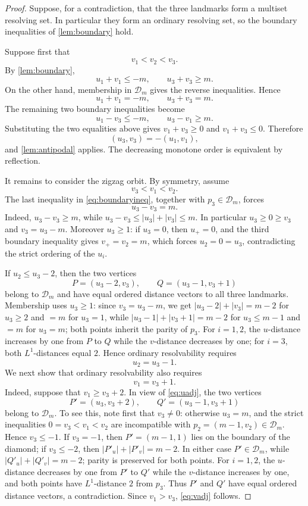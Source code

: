 \documentclass[10pt,a4paper]{amsart}
\newcommand{\D}{\mathcal D}
\begin{document}
\begin{proof}
Suppose, for a contradiction, that the three landmarks form a multiset resolving set.  In particular they form an ordinary resolving set, so the boundary inequalities of \cref{lem:boundary} hold.

Suppose first that
\[
 v_1<v_2<v_3.
\]
By \cref{lem:boundary},
\[
 u_1+v_1\le -m,
 \qquad
 u_3+v_3\ge m.
\]
On the other hand, membership in $\D_m$ gives the reverse inequalities.  Hence
\[
 u_1+v_1=-m,
 \qquad
 u_3+v_3=m.
\]
The remaining two boundary inequalities become
\[
 u_1-v_3\le -m,
 \qquad
 u_3-v_1\ge m.
\]
Substituting the two equalities above gives $v_1+v_3\ge0$ and $v_1+v_3\le0$.  Therefore
\[
 (u_3,v_3)=-(u_1,v_1),
\]
and \cref{lem:antipodal} applies.  The decreasing monotone order is equivalent by reflection.

It remains to consider the zigzag orbit.  By symmetry, assume
\begin{equation}\label{eq:zigzagorder}
 v_3<v_1<v_2.
\end{equation}
The last inequality in \eqref{eq:boundaryineq}, together with $p_3\in\D_m$, forces
\begin{equation}\label{eq:p3edge}
 u_3-v_3=m.
\end{equation}
Indeed, $u_3-v_3\ge m$, while $u_3-v_3\le |u_3|+|v_3|\le m$.  In particular $u_3\ge0\ge v_3$ and $v_3=u_3-m$.  Moreover $u_3\ge1$: if $u_3=0$, then $u_+=0$, and the third boundary inequality gives $v_+=v_2=m$, which forces $u_2=0=u_3$, contradicting the strict ordering of the $u_i$.

If $u_2\le u_3-2$, then the two vertices
\[
 P=(u_3-2,v_3),
 \qquad
 Q=(u_3-1,v_3+1)
\]
belong to $\D_m$ and have equal ordered distance vectors to all three landmarks.  Membership uses $u_3\ge1$: since $v_3=u_3-m$, we get $|u_3-2|+|v_3|=m-2$ for $u_3\ge2$ and $=m$ for $u_3=1$, while $|u_3-1|+|v_3+1|=m-2$ for $u_3\le m-1$ and $=m$ for $u_3=m$; both points inherit the parity of $p_3$.  For $i=1,2$, the $u$-distance increases by one from $P$ to $Q$ while the $v$-distance decreases by one; for $i=3$, both $L^1$-distances equal $2$.  Hence ordinary resolvability requires
\begin{equation}\label{eq:uadj}
 u_2=u_3-1.
\end{equation}
We next show that ordinary resolvability also requires
\begin{equation}\label{eq:vadj}
 v_1=v_3+1.
\end{equation}
Indeed, suppose that $v_1\ge v_3+2$.  In view of \eqref{eq:uadj}, the two vertices
\[
 P'=(u_3,v_3+2),
 \qquad
 Q'=(u_3-1,v_3+1)
\]
belong to $\D_m$.  To see this, note first that $v_3\ne0$: otherwise $u_3=m$, and the strict inequalities $0=v_3<v_1<v_2$ are incompatible with $p_2=(m-1,v_2)\in\D_m$.  Hence $v_3\le-1$.  If $v_3=-1$, then $P'=(m-1,1)$ lies on the boundary of the diamond; if $v_3\le-2$, then $|P'_u|+|P'_v|=m-2$.  In either case $P'\in\D_m$, while $|Q'_u|+|Q'_v|=m-2$; parity is preserved for both points.  For $i=1,2$, the $u$-distance decreases by one from $P'$ to $Q'$ while the $v$-distance increases by one, and both points have $L^1$-distance $2$ from $p_3$.  Thus $P'$ and $Q'$ have equal ordered distance vectors, a contradiction.  Since $v_1>v_3$, \eqref{eq:vadj} follows.


\end{proof}
\end{document}
